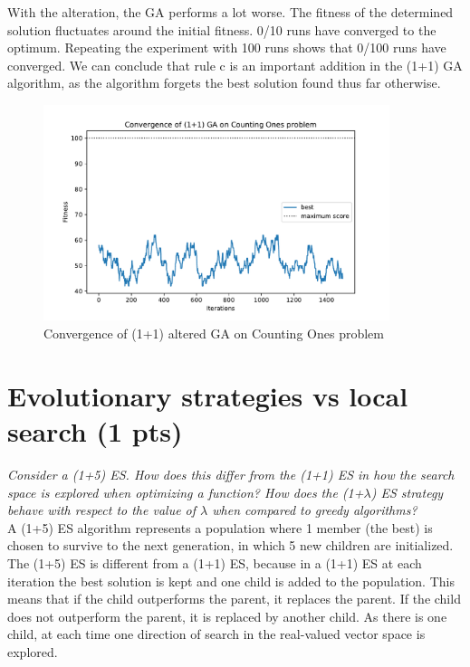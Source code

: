\documentclass{article}
\begin{document}
\begin{enumerate}[label=\alph*)]
    With the alteration, the GA performs a lot worse. The fitness of the determined solution fluctuates around the initial fitness. 0/10 runs have converged to the optimum. Repeating the experiment with 100 runs shows that 0/100 runs have converged. We can conclude that rule c is an important addition in the (1+1) GA algorithm, as the algorithm forgets the best solution found thus far otherwise.
    \begin{figure}[H]
        \centering
        \includegraphics[width=0.9\textwidth]{Assignment 1/Figures/A1_4c.pdf}
        \caption{Convergence of (1+1) altered GA on Counting Ones problem}
        \label{fig:A1_4c}
    \end{figure}
\end{enumerate}

\section{Evolutionary strategies vs local search (1 pts)}
\textit{Consider a (1+5) ES. How does this differ from the (1+1) ES in how the search space is explored when optimizing a function? How does the (1+$\lambda$) ES strategy behave with respect to the value of $\lambda$ when compared to greedy algorithms? } \\ 

A (1+5) ES algorithm represents a population where 1 member (the best) is chosen to survive to the next generation, in which 5 new children are initialized. The (1+5) ES is different from a (1+1) ES, because in a (1+1) ES at each iteration the best solution is kept and one child is added to the population. This means that if the child outperforms the parent, it replaces the parent. If the child does not outperform the parent, it is replaced by another child. As there is one child, at each time one direction of search in the real-valued vector space is explored.
\end{document}
